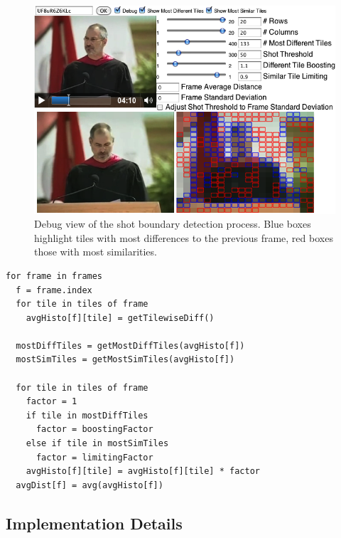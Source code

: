 \begin{figure}
  \begin{center}
    \includegraphics[width=1.0\linewidth]{./algorithm.png}
  \end{center}
  \caption[Debug view of the shot boundary detection process]
    {Debug view of the shot boundary detection process.
    Blue boxes highlight tiles with most differences
    to the previous frame, red boxes those with most similarities.}
  \label{fig:algorithm}
\end{figure}

\begin{lstlisting}[caption=Pseudocode of the shot boundary detection
  algorithm,
  label=code:algorithm, float]
for frame in frames
  f = frame.index  
  for tile in tiles of frame      
    avgHisto[f][tile] = getTilewiseDiff()
 
  mostDiffTiles = getMostDiffTiles(avgHisto[f])
  mostSimTiles = getMostSimTiles(avgHisto[f])
 
  for tile in tiles of frame    
    factor = 1  
    if tile in mostDiffTiles
      factor = boostingFactor
    else if tile in mostSimTiles
      factor = limitingFactor
    avgHisto[f][tile] = avgHisto[f][tile] * factor
  avgDist[f] = avg(avgHisto[f])
\end{lstlisting}

\subsection{Implementation Details}
\label{sec:implementation}

